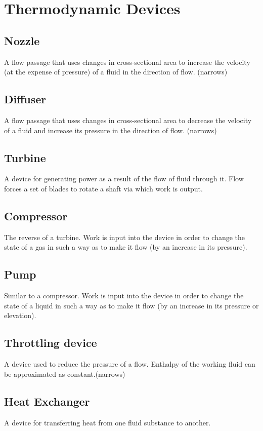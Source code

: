 \section{Thermodynamic Devices}
\subsection{Nozzle}
A flow passage that uses changes in cross-sectional area to increase the velocity (at the expense of pressure) of a fluid in the
direction of flow. (narrows)

\subsection{Diffuser}
A flow passage that uses changes in cross-sectional area to decrease the velocity of a fluid and increase its pressure in the
direction of flow. (narrows)

\subsection{Turbine}
A device for generating power as a result of the flow of fluid through it. Flow forces a set of blades to rotate a shaft via
which work is output.

\subsection{Compressor}
The reverse of a turbine. Work is input into the device in order to change the state of a gas in such a way as to make it flow (by an increase in its pressure).

\subsection{Pump}
Similar to a compressor. Work is input into the device in order to change the state of a liquid in such a way as to make it flow (by an increase in its pressure or elevation).

\subsection{Throttling device}
A device used to reduce the pressure of a flow. Enthalpy of the working fluid can be approximated as constant.(narrows)

\subsection{Heat Exchanger}
A device for transferring heat from one fluid substance to another.